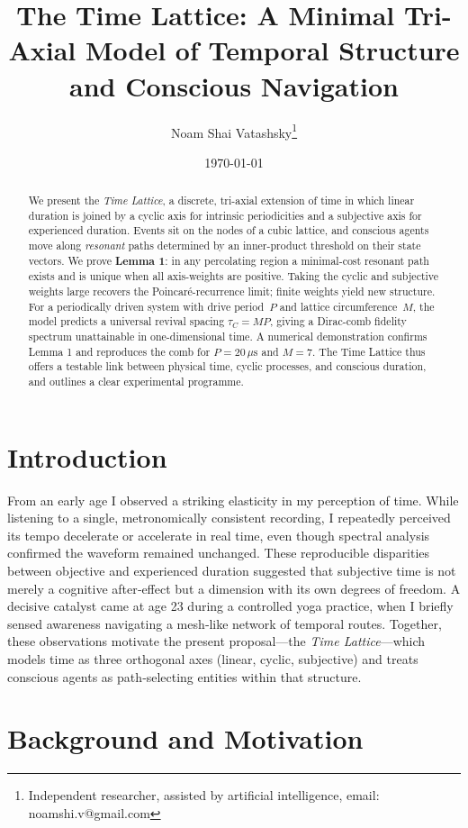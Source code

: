 \documentclass[11pt]{article}
\title{The Time Lattice: A Minimal Tri-Axial Model of Temporal Structure and Conscious Navigation}
\author{Noam Shai Vatashsky\thanks{Independent researcher, assisted by artificial intelligence, email: noamshi.v@gmail.com}}
\date{\today}
\begin{document}
\maketitle

\begin{abstract}
We present the \textit{Time Lattice}, a discrete, tri-axial extension of
time in which linear duration is joined by a cyclic axis for intrinsic
periodicities and a subjective axis for experienced duration.
Events sit on the nodes of a cubic lattice, and conscious agents move
along \emph{resonant} paths determined by an inner-product threshold on
their state vectors.  We prove \textbf{Lemma 1}: in any percolating region
a minimal-cost resonant path exists and is unique when all axis-weights
are positive.  Taking the cyclic and subjective weights large recovers the
Poincaré-recurrence limit; finite weights yield new structure.  For a
periodically driven system with drive period~\(P\) and lattice
circumference~\(M\), the model predicts a universal revival spacing
\(\tau_C = MP\), giving a Dirac-comb fidelity spectrum unattainable in
one-dimensional time.  A numerical demonstration confirms Lemma 1 and
reproduces the comb for \(P = 20\,\mu\text{s}\) and \(M = 7\).
The Time Lattice thus offers a testable link between physical time, cyclic
processes, and conscious duration, and outlines a clear experimental
programme.
\end{abstract}

\section{Introduction}
From an early age I observed a striking elasticity in my perception of time. While listening to a single, metronomically consistent recording, I repeatedly perceived its tempo decelerate or accelerate in real time, even though spectral analysis confirmed the waveform remained unchanged. These reproducible disparities between objective and experienced duration suggested that subjective time is not merely a cognitive after‑effect but a dimension with its own degrees of freedom. A decisive catalyst came at age 23 during a controlled yoga practice, when I briefly sensed awareness navigating a mesh‑like network of temporal routes. Together, these observations motivate the present proposal—the \textit{Time Lattice}—which models time as three orthogonal axes (linear, cyclic, subjective) and treats conscious agents as path‑selecting entities within that structure.

\section{Background and Motivation}
\end{document}

